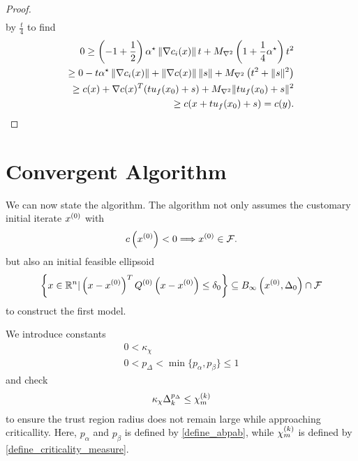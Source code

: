 \begin{proof}
\begin{align*}
\end{align*}
by $\frac t 4$ to find
\begin{align*}
0 \ge \left(-1 + \frac 1 2\right) { \alpha^{\star} } \left\|\nabla c_i(x)\right\| t +  {M_{\nabla^2}}\left(1 + \frac 1 4 { \alpha^{\star} }\right) t^2 \\
\ge 0 -  t{ \alpha^{\star} } \left\| \nabla c_i(x) \right\| + \left\| \nabla c(x)\right\| \left\|s\right\| + {M_{\nabla^2}}\left(t^2 + \|s\|^2\right) \\
\ge c(x) + \nabla c(x)^T (t {u_{f}(x_0)} + s) + {M_{\nabla^2}} \|t {u_{f}(x_0)} + s\|^2 \\
\ge c(x + t {u_{f}(x_0)} + s) = c(y).
\end{align*}


\end{proof}

\section{Convergent Algorithm}
\label{the_algroithm_section}

We can now state the algorithm.
The algorithm not only assumes the customary initial iterate $ {x^{(0)}} $ with 
\begin{align}
\label{initial_point_is_feasible}
c\left({x^{(0)}}\right) < 0 \Longrightarrow {x^{(0)}} \in {\mathcal F}.
\end{align}
but also an initial feasible ellipsoid
\begin{align}
\left\{x \in\mathbb R^n | \left(x - {x^{(0)}}\right)^T Q^{(0)} \left(x - {x^{(0)}}\right) \le \delta_0 \right\} \subseteq B_{\infty}\left({x^{(0)}}, \Delta_{0}\right) \cap {\mathcal F} \label{initial_ellipsoid}
\end{align}
to construct the first model.


We introduce constants
\begin{align}
0 < \kappa_{\chi} \label{define_kappa_chi} \\
0 < p_{\Delta} < \min\{p_{\alpha}, p_{\beta}\} \le 1 \label{define_p_delta} 
\end{align}
and check
\begin{align}
\kappa_{\chi} \Delta_k^{p_{\Delta}} \le {\chi_m^{(k)}} \label{criticallity_check}
\end{align}
to ensure the trust region radius does not remain large while approaching criticallity.
Here,
$p_{\alpha}$ and $p_{\beta}$ is defined by \cref{define_abpab},
while ${\chi_m^{(k)}}$ is defined by \cref{define_criticality_measure}.



